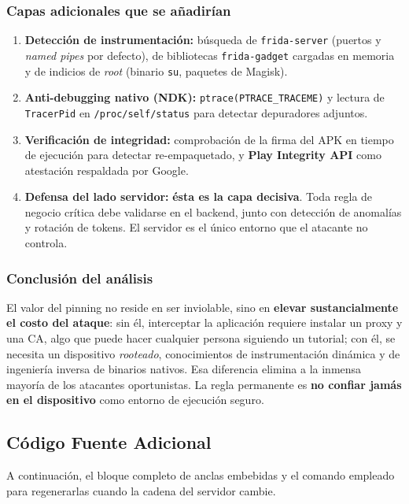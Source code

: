 \documentclass[12pt, a4paper]{article} %
\begin{document}
\subsubsection{Capas adicionales que se añadirían}
\begin{enumerate}
    \item \textbf{Detección de instrumentación:} búsqueda de
    \texttt{frida-server} (puertos y \textit{named pipes} por defecto), de
    bibliotecas \texttt{frida-gadget} cargadas en memoria y de indicios de
    \textit{root} (binario \texttt{su}, paquetes de Magisk).
    \item \textbf{Anti-debugging nativo (NDK):}
    \texttt{ptrace(PTRACE\_TRACEME)} y lectura de \texttt{TracerPid} en
    \texttt{/proc/self/status} para detectar depuradores adjuntos.
    \item \textbf{Verificación de integridad:} comprobación de la firma del
    APK en tiempo de ejecución para detectar re-empaquetado, y
    \textbf{Play Integrity API} como atestación respaldada por Google.
    \item \textbf{Defensa del lado servidor:} \textbf{ésta es la capa
    decisiva}. Toda regla de negocio crítica debe validarse en el backend,
    junto con detección de anomalías y rotación de tokens. El servidor es el
    único entorno que el atacante no controla.
\end{enumerate}

\subsubsection{Conclusión del análisis}
El valor del pinning no reside en ser inviolable, sino en \textbf{elevar
sustancialmente el costo del ataque}: sin él, interceptar la aplicación
requiere instalar un proxy y una CA, algo que puede hacer cualquier persona
siguiendo un tutorial; con él, se necesita un dispositivo \textit{rooteado},
conocimientos de instrumentación dinámica y de ingeniería inversa de binarios
nativos. Esa diferencia elimina a la inmensa mayoría de los atacantes
oportunistas. La regla permanente es \textbf{no confiar jamás en el
dispositivo} como entorno de ejecución seguro.

\subsection{Código Fuente Adicional}
A continuación, el bloque completo de anclas embebidas y el comando empleado
para regenerarlas cuando la cadena del servidor cambie.
\end{document}
